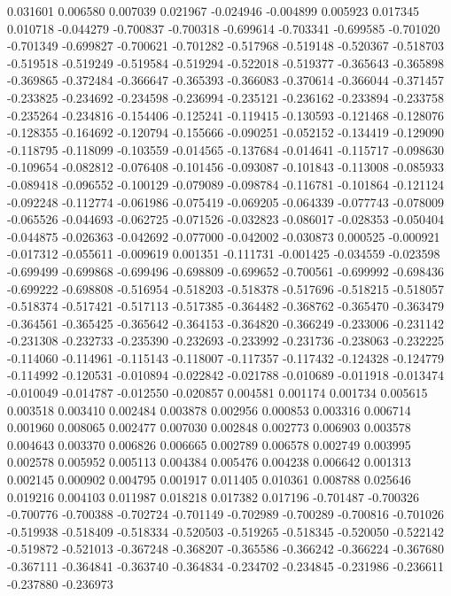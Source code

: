 0.031601
0.006580
0.007039
0.021967
-0.024946
-0.004899
0.005923
0.017345
0.010718
-0.044279
-0.700837
-0.700318
-0.699614
-0.703341
-0.699585
-0.701020
-0.701349
-0.699827
-0.700621
-0.701282
-0.517968
-0.519148
-0.520367
-0.518703
-0.519518
-0.519249
-0.519584
-0.519294
-0.522018
-0.519377
-0.365643
-0.365898
-0.369865
-0.372484
-0.366647
-0.365393
-0.366083
-0.370614
-0.366044
-0.371457
-0.233825
-0.234692
-0.234598
-0.236994
-0.235121
-0.236162
-0.233894
-0.233758
-0.235264
-0.234816
-0.154406
-0.125241
-0.119415
-0.130593
-0.121468
-0.128076
-0.128355
-0.164692
-0.120794
-0.155666
-0.090251
-0.052152
-0.134419
-0.129090
-0.118795
-0.118099
-0.103559
-0.014565
-0.137684
-0.014641
-0.115717
-0.098630
-0.109654
-0.082812
-0.076408
-0.101456
-0.093087
-0.101843
-0.113008
-0.085933
-0.089418
-0.096552
-0.100129
-0.079089
-0.098784
-0.116781
-0.101864
-0.121124
-0.092248
-0.112774
-0.061986
-0.075419
-0.069205
-0.064339
-0.077743
-0.078009
-0.065526
-0.044693
-0.062725
-0.071526
-0.032823
-0.086017
-0.028353
-0.050404
-0.044875
-0.026363
-0.042692
-0.077000
-0.042002
-0.030873
0.000525
-0.000921
-0.017312
-0.055611
-0.009619
0.001351
-0.111731
-0.001425
-0.034559
-0.023598
-0.699499
-0.699868
-0.699496
-0.698809
-0.699652
-0.700561
-0.699992
-0.698436
-0.699222
-0.698808
-0.516954
-0.518203
-0.518378
-0.517696
-0.518215
-0.518057
-0.518374
-0.517421
-0.517113
-0.517385
-0.364482
-0.368762
-0.365470
-0.363479
-0.364561
-0.365425
-0.365642
-0.364153
-0.364820
-0.366249
-0.233006
-0.231142
-0.231308
-0.232733
-0.235390
-0.232693
-0.233992
-0.231736
-0.238063
-0.232225
-0.114060
-0.114961
-0.115143
-0.118007
-0.117357
-0.117432
-0.124328
-0.124779
-0.114992
-0.120531
-0.010894
-0.022842
-0.021788
-0.010689
-0.011918
-0.013474
-0.010049
-0.014787
-0.012550
-0.020857
0.004581
0.001174
0.001734
0.005615
0.003518
0.003410
0.002484
0.003878
0.002956
0.000853
0.003316
0.006714
0.001960
0.008065
0.002477
0.007030
0.002848
0.002773
0.006903
0.003578
0.004643
0.003370
0.006826
0.006665
0.002789
0.006578
0.002749
0.003995
0.002578
0.005952
0.005113
0.004384
0.005476
0.004238
0.006642
0.001313
0.002145
0.000902
0.004795
0.001917
0.011405
0.010361
0.008788
0.025646
0.019216
0.004103
0.011987
0.018218
0.017382
0.017196
-0.701487
-0.700326
-0.700776
-0.700388
-0.702724
-0.701149
-0.702989
-0.700289
-0.700816
-0.701026
-0.519938
-0.518409
-0.518334
-0.520503
-0.519265
-0.518345
-0.520050
-0.522142
-0.519872
-0.521013
-0.367248
-0.368207
-0.365586
-0.366242
-0.366224
-0.367680
-0.367111
-0.364841
-0.363740
-0.364834
-0.234702
-0.234845
-0.231986
-0.236611
-0.237880
-0.236973
